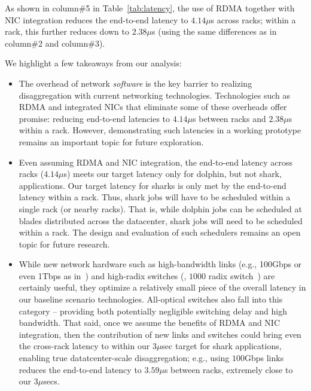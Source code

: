 As shown in column\#5 in Table~\ref{tab:latency}, the use of RDMA together with NIC integration reduces the end-to-end latency to $4.14\mu$s across racks; within a rack, this further reduces down to $2.38\mu$s (using the same differences as in column\#2 and column\#3).

 We highlight a few takeaways from our analysis:
%
\begin{itemize}[leftmargin=*]
\itemsep0em
	\item The overhead of network \emph{software} is the key barrier to realizing disaggregation with current networking technologies. Technologies such as RDMA and integrated NICs that eliminate some of these overheads offer promise: reducing end-to-end latencies to $4.14\mu$s between racks and $2.38\mu$s within a rack. However, demonstrating such latencies in a working prototype remains an important topic for future exploration.
	\item Even assuming RDMA and NIC integration, the end-to-end latency across racks ($4.14\mu$s) meets our target latency only for dolphin, but not shark, applications. Our target latency for sharks is only met by the end-to-end latency within a rack. Thus, shark jobs will have to be scheduled within a single rack (or nearby racks).
	That is, while dolphin jobs can be scheduled at blades distributed across the datacenter, shark jobs will need to be scheduled within a rack. The design and evaluation of such schedulers remains an open topic for future research.
	\item While new network hardware such as high-bandwidth links (e.g., 100Gbps or even 1Tbps as in~\cite{vladimir, firebox}) and high-radix switches (\eg, $1000$ radix switch~\cite{firebox})  are certainly useful, they optimize a relatively small piece of the overall latency in our baseline scenario technologies. All-optical switches also fall into this category -- providing both potentially negligible switching delay and high bandwidth. That said, once we assume the benefits of RDMA and NIC integration, then the contribution of new links and switches could bring even the cross-rack latency to within our 3$\mu$sec target for shark applications, enabling true datatcenter-scale disaggregation; e.g., using $100$Gbps links reduces the end-to-end latency to $3.59\mu$s between racks, extremely close to our 3$\mu$secs. 

\end{itemize}
